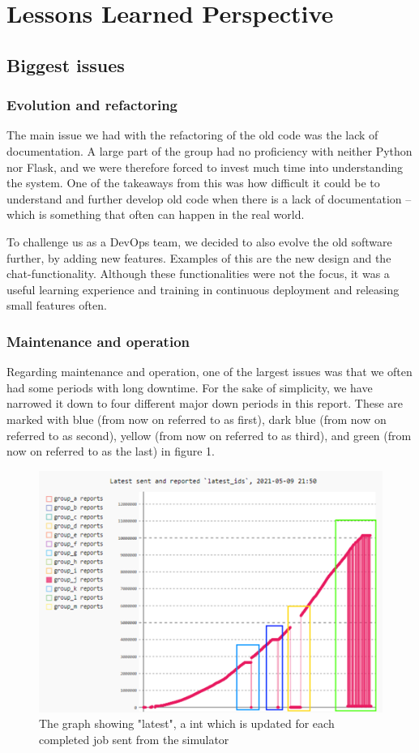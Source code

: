 \section{Lessons Learned Perspective}
\subsection{Biggest issues}
\subsubsection{Evolution and refactoring}
The main issue we had with the refactoring of the old code was the lack of documentation. A large part of the group had no proficiency with neither Python nor Flask, and we were therefore forced to invest much time into understanding the system. One of the takeaways from this was how difficult it could be to understand and further develop old code when there is a lack of documentation – which is something that often can happen in the real world.

To challenge us as a DevOps team, we decided to also evolve the old software further, by adding new features. Examples of this are the new design and the chat-functionality. Although these functionalities were not the focus, it was a useful learning experience and training in continuous deployment and releasing small features often.

\subsubsection{Maintenance and operation}

Regarding maintenance and operation, one of the largest issues was that we often had some periods with long downtime. For the sake of simplicity, we have narrowed it down to four different major down periods in this report. These are marked with blue (from now on referred to as first), dark blue (from now on referred to as second), yellow (from now on referred to as third), and green (from now on referred to as the last) in figure 1. 

\begin{figure}[h!]
    \centering
    \includegraphics[scale=0.7]{images/downperiodes.png}
    \caption{The graph showing "latest", a int which is updated for each completed job sent from the simulator }
\end{figure}
 
